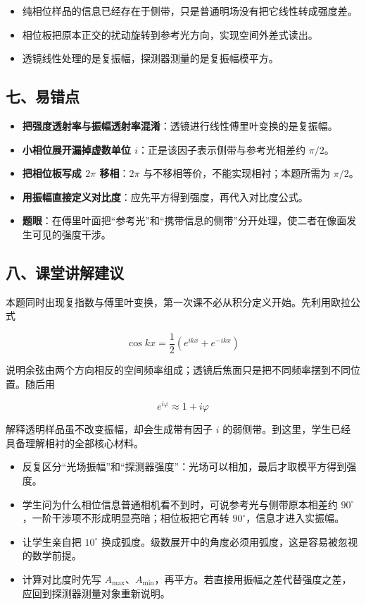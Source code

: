\documentclass[12pt,a4paper,UTF8]{ctexart}
\newcommand{\tightlist}{\setlength{\itemsep}{0pt}\setlength{\parskip}{0pt}}
\begin{document}
\begin{itemize}
\tightlist
\item
  纯相位样品的信息已经存在于侧带，只是普通明场没有把它线性转成强度差。
\item
  相位板把原本正交的扰动旋转到参考光方向，实现空间外差式读出。
\item
  透镜线性处理的是复振幅，探测器测量的是复振幅模平方。
\end{itemize}

\subsection{七、易错点}\label{ux4e03ux6613ux9519ux70b9-6}

\begin{itemize}
\tightlist
\item
  \textbf{把强度透射率与振幅透射率混淆}：透镜进行线性傅里叶变换的是复振幅。
\item
  \textbf{小相位展开漏掉虚数单位
  \(i\)}：正是该因子表示侧带与参考光相差约 \(\pi/2\)。
\item
  \textbf{把相位板写成 \(2\pi\) 移相}：\(2\pi\)
  与不移相等价，不能实现相衬；本题所需为 \(\pi/2\)。
\item
  \textbf{用振幅直接定义对比度}：应先平方得到强度，再代入对比度公式。
\item
  \textbf{题眼}：在傅里叶面把``参考光''和``携带信息的侧带''分开处理，使二者在像面发生可见的强度干涉。
\end{itemize}

\subsection{八、课堂讲解建议}\label{ux516bux8bfeux5802ux8bb2ux89e3ux5efaux8bae-6}

本题同时出现复指数与傅里叶变换，第一次课不必从积分定义开始。先利用欧拉公式

\[\cos kx=\frac12(e^{ikx}+e^{-ikx})\]

说明余弦由两个方向相反的空间频率组成；透镜后焦面只是把不同频率摆到不同位置。随后用

\[e^{i\varphi}\approx1+i\varphi\]

解释透明样品虽不改变振幅，却会生成带有因子 \(i\)
的弱侧带。到这里，学生已经具备理解相衬的全部核心材料。

\begin{itemize}
\tightlist
\item
  反复区分``光场振幅''和``探测器强度''：光场可以相加，最后才取模平方得到强度。
\item
  学生问为什么相位信息普通相机看不到时，可说参考光与侧带原本相差约
  \(90^\circ\)，一阶干涉项不形成明显亮暗；相位板把它再转
  \(90^\circ\)，信息才进入实振幅。
\item
  让学生亲自把 \(10^\circ\)
  换成弧度。级数展开中的角度必须用弧度，这是容易被忽视的数学前提。
\item
  计算对比度时先写
  \(A_{\max}\)、\(A_{\min}\)，再平方。若直接用振幅之差代替强度之差，应回到探测器测量对象重新说明。
\end{itemize}
\end{document}
